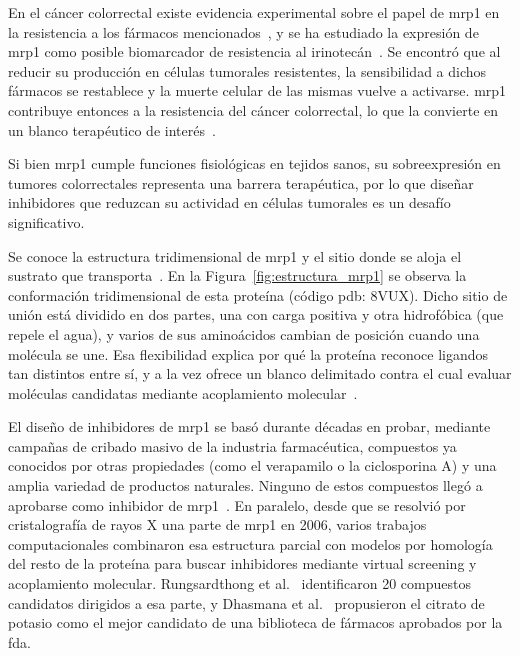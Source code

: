 En el cáncer colorrectal existe evidencia experimental sobre el papel de \gls{mrp1} en la resistencia a los fármacos mencionados~\cite{cao2017role}, y se ha estudiado la expresión de \gls{mrp1} como posible biomarcador de resistencia al irinotecán~\cite{marin2022expression}. Se encontró que al reducir su producción en células tumorales resistentes, la sensibilidad a dichos fármacos se restablece y la muerte celular de las mismas vuelve a activarse. \Gls{mrp1} contribuye entonces a la resistencia del cáncer colorrectal, lo que la convierte en un blanco terapéutico de interés~\cite{cao2017role}.

Si bien \gls{mrp1} cumple funciones fisiológicas en tejidos sanos, su sobreexpresión en tumores colorrectales representa una barrera terapéutica, por lo que diseñar inhibidores que reduzcan su actividad en células tumorales es un desafío significativo.

Se conoce la estructura tridimensional de \gls{mrp1} y el sitio donde se aloja el sustrato que transporta~\cite{johnson_structural_2017}. En la Figura~\ref{fig:estructura_mrp1} se observa la conformación tridimensional de esta proteína (código \gls{pdb}: 8VUX). Dicho sitio de unión está dividido en dos partes, una con carga positiva y otra hidrofóbica (que repele el agua), y varios de sus aminoácidos cambian de posición cuando una molécula se une. Esa flexibilidad explica por qué la proteína reconoce ligandos tan distintos entre sí, y a la vez ofrece un blanco delimitado contra el cual evaluar moléculas candidatas mediante acoplamiento molecular~\cite{johnson_structural_2017}.



El diseño de inhibidores de \gls{mrp1} se basó durante décadas en probar, mediante campañas de cribado masivo de la industria farmacéutica, compuestos ya conocidos por otras propiedades (como el verapamilo o la ciclosporina A) y una amplia variedad de productos naturales. Ninguno de estos compuestos llegó a aprobarse como inhibidor de \gls{mrp1}~\cite{stefan2019}. En paralelo, desde que se resolvió por cristalografía de rayos X una parte de \gls{mrp1} en 2006, varios trabajos computacionales combinaron esa estructura parcial con modelos por homología del resto de la proteína para buscar inhibidores mediante virtual screening y acoplamiento molecular. Rungsardthong et al.~\cite{rungsardthong2012} identificaron 20 compuestos candidatos dirigidos a esa parte, y Dhasmana et al.~\cite{dhasmana2018} propusieron el citrato de potasio como el mejor candidato de una biblioteca de fármacos aprobados por la \gls{fda}. 

